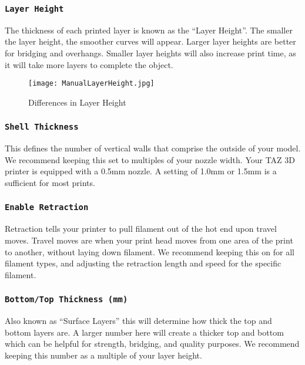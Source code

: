 \subsubsection{\texttt{Layer Height}}
The thickness of each printed layer is known as the ``Layer Height''. The smaller the layer height, the smoother curves will appear. Larger layer heights are better for bridging and overhangs. Smaller layer heights will also increase print time, as it will take more layers to complete the object.
\begin{figure}[H]
\centering
\texttt{[image: ManualLayerHeight.jpg]}
\caption{Differences in Layer Height}
\label{fig:Differences in Layer Height}
\end{figure}


\subsubsection{\texttt{Shell Thickness}}
This defines the number of vertical walls that comprise the outside of your model. We recommend keeping this set to multiples of your nozzle width. Your TAZ 3D printer is equipped with a 0.5mm nozzle. A setting of 1.0mm or 1.5mm is a sufficient for most prints.

\subsubsection{\texttt{Enable Retraction}}
Retraction tells your printer to pull filament out of the hot end upon travel moves. Travel moves are when your print head moves from one area of the print to another, without laying down filament. We recommend keeping this on for all filament types, and adjusting the retraction length and speed for the specific filament.

\subsubsection{\texttt{Bottom/Top Thickness (mm)}}
Also known as ``Surface Layers'' this will determine how thick the top and bottom layers are. A larger number here will create a thicker top and bottom which can be helpful for strength, bridging, and quality purposes. We recommend keeping this number as a multiple of your layer height.

